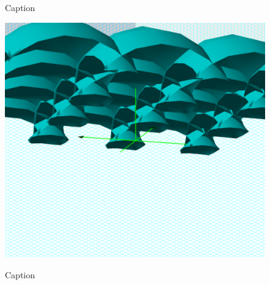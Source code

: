 {\begin{figure}[H]
\begin{minipage}[b]{\w}
      \caption{Caption}
      \vspace{4ex}
    \end{minipage} %
    \begin{minipage}[b]{\w}
      \centering
      \label{surface:5}
      \includegraphics[width=\fw]{img/16-surface/05.png}
      \caption{Caption}
      \vspace{4ex}
    \end{minipage} %
  \end{figure}

}


